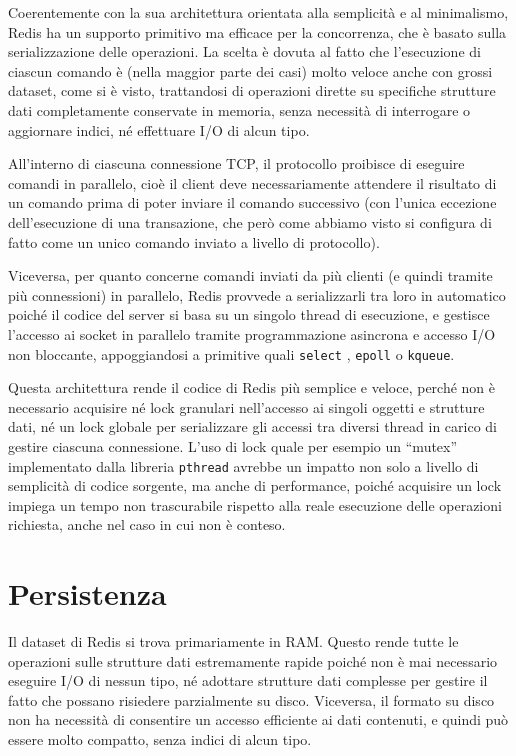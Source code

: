 Coerentemente con la sua architettura orientata alla semplicità e al minimalismo, Redis ha un
supporto primitivo ma efficace per la concorrenza, che è basato sulla serializzazione delle
operazioni. La scelta è dovuta al fatto che l'esecuzione di ciascun comando è (nella maggior parte
dei casi) molto veloce anche con grossi dataset, come si è visto, trattandosi di operazioni dirette
su specifiche strutture dati completamente conservate in memoria, senza necessità di interrogare o
aggiornare indici, né effettuare I/O di alcun tipo.

All'interno di ciascuna connessione TCP, il protocollo proibisce di eseguire comandi in parallelo,
cioè il client deve necessariamente attendere il risultato di un comando prima di poter inviare il
comando successivo (con l'unica eccezione dell'esecuzione di una transazione, che però come abbiamo
visto si configura di fatto come un unico comando inviato a livello di protocollo).

Viceversa, per quanto concerne comandi inviati da più clienti (e quindi tramite più connessioni) in
parallelo, Redis provvede a serializzarli tra loro in automatico poiché il codice del server si
basa su un singolo thread di esecuzione, e gestisce l'accesso ai socket in parallelo tramite
programmazione asincrona e accesso I/O non bloccante, appoggiandosi a primitive quali \verb|select| 
\cite{select}, \verb|epoll| \cite{epoll} o \verb|kqueue|.

Questa architettura rende il codice di Redis più semplice e veloce, perché non è necessario
acquisire né lock granulari nell'accesso ai singoli oggetti e strutture dati, né un lock globale
per serializzare gli accessi tra diversi thread in carico di gestire ciascuna connessione. L'uso di
lock quale per esempio un ``mutex'' implementato dalla libreria \verb|pthread| avrebbe un impatto non
solo a livello di semplicità di codice sorgente, ma anche di performance, poiché acquisire un lock
impiega un tempo non trascurabile rispetto alla reale esecuzione delle operazioni richiesta, anche
nel caso in cui non è conteso.

\section{Persistenza}
\label{persistence}

Il dataset di Redis si trova primariamente in RAM. Questo rende tutte le operazioni sulle strutture
dati estremamente rapide poiché non è mai necessario eseguire I/O di nessun tipo, né adottare
strutture dati complesse per gestire il fatto che possano risiedere parzialmente su disco. Viceversa,
il formato su disco non ha necessità di consentire un accesso efficiente ai dati contenuti,
e quindi può essere molto compatto, senza indici di alcun tipo.

